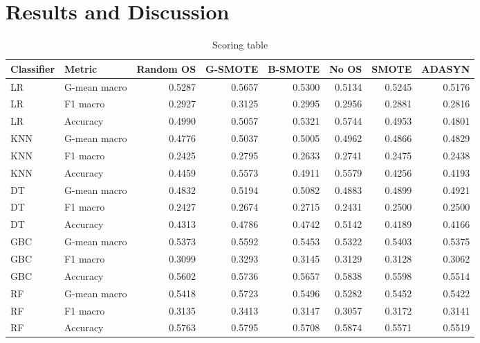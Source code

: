 \documentclass[parskip=full]{scrartcl}
\begin{document}
\section{Results and Discussion}

\begin{table}[H]
	\centering
	\begin{tabular}{llrrrrrr}
	\toprule
	Classifier &        Metric &  Random OS &  G-SMOTE &  B-SMOTE &   No OS &   SMOTE &  ADASYN \\
	\midrule
	        LR &  G-mean macro &     0.5287 &   0.5657 &   0.5300 &  0.5134 &
					0.5245 &  0.5176 \\
	        LR &      F1 macro &     0.2927 &   0.3125 &   0.2995 &  0.2956 &
					0.2881 &  0.2816 \\
	        LR &      Accuracy &     0.4990 &   0.5057 &   0.5321 &  0.5744 &
					0.4953 &  0.4801 \\
					\hline
	       KNN &  G-mean macro &     0.4776 &   0.5037 &   0.5005 &  0.4962 &
				 0.4866 &  0.4829 \\
	       KNN &      F1 macro &     0.2425 &   0.2795 &   0.2633 &  0.2741 &
				 0.2475 &  0.2438 \\
	       KNN &      Accuracy &     0.4459 &   0.5573 &   0.4911 &  0.5579 &
				 0.4256 &  0.4193 \\
				 \hline
	        DT &  G-mean macro &     0.4832 &   0.5194 &   0.5082 &  0.4883 &
					0.4899 &  0.4921 \\
	        DT &      F1 macro &     0.2427 &   0.2674 &   0.2715 &  0.2431 &
					0.2500 &  0.2500 \\
	        DT &      Accuracy &     0.4313 &   0.4786 &   0.4742 &  0.5142 &
					0.4189 &  0.4166 \\
					\hline
	       GBC &  G-mean macro &     0.5373 &   0.5592 &   0.5453 &  0.5322 &
				 0.5403 &  0.5375 \\
	       GBC &      F1 macro &     0.3099 &   0.3293 &   0.3145 &  0.3129 &
				 0.3128 &  0.3062 \\
	       GBC &      Accuracy &     0.5602 &   0.5736 &   0.5657 &  0.5838 &
				 0.5598 &  0.5514 \\
				 \hline
	        RF &  G-mean macro &     0.5418 &   0.5723 &   0.5496 &  0.5282 &
					0.5452 &  0.5422 \\
	        RF &      F1 macro &     0.3135 &   0.3413 &   0.3147 &  0.3057 &
					0.3172 &  0.3141 \\
	        RF &      Accuracy &     0.5763 &   0.5795 &   0.5708 &  0.5874 &
					0.5571 &  0.5519 \\
	\bottomrule
	\end{tabular}
	\caption{\label{tab:scores}Scoring table}
\end{table}
\end{document}
